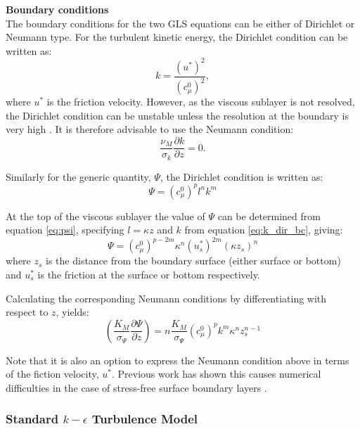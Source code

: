 \par{\textbf{Boundary conditions}\\}
The boundary conditions for the two GLS equations can be either of Dirichlet or Neumann
type. For the turbulent kinetic energy, the Dirichlet condition can be written as:
\begin{equation}
k=\frac{\left(u^*\right)^2}{\left(c_\mu^0\right)^2},
\label{eq:k_dir_bc}
\end{equation}
where $u^*$ is the friction velocity. However, as the viscous sublayer is not
resolved, the Dirichlet condition can be unstable unless the resolution at the
boundary is very high \citep{burchard1999}. It is therefore advisable to use
the Neumann condition:
\begin{equation}
\frac{\nu_M}{\sigma_k}\frac{\partial k}{\partial z} = 0.
\end{equation}

Similarly for the generic quantity, $\Psi$, the Dirichlet condition is written
as:
\begin{equation}
\Psi=\left(c_\mu^0\right)^{p}l^nk^m
\end{equation}

At the top of the viscous sublayer the value of $\Psi$ can be determined from equation \ref{eq:psi}, 
specifying $l=\kappa z$ and $k$ from equation \ref{eq:k_dir_bc}, giving:
\begin{equation}
\Psi=\left(c_\mu^0\right)^{p-2m}\kappa^n\left(u_s^*\right)^{2m}\left(\kappa z_s\right)^n
\end{equation}
where $z_s$ is the distance from the boundary surface (either surface or bottom) and $u_s^*$ is the 
friction at the surface or bottom respectively.

Calculating the corresponding Neumann  conditions by differentiating with respect to $z$, yields:
\begin{equation}
\left(\frac{K_M}{\sigma_{\Psi}}\frac{\partial\Psi}{\partial z}\right) = n\frac{K_M}{\sigma_{\Psi}} \left(c_\mu^0\right)^p k^m \kappa^n z_s^{n-1}
\label{eq:psi-flux-bc}
\end{equation}

Note that it is also an option to express the Neumann condition above in terms
of the fiction velocity, $u^*$. Previous work has shown this causes numerical
difficulties in the case of stress-free surface boundary layers \citep{burchard1999}.


\subsubsection{Standard $k-\epsilon$ Turbulence Model}\label{sec:kepsilon}

